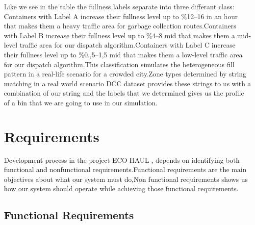 \documentclass[12pt,a4paper]{report}
\begin{document}
\indent Like we see in the table the fullness labels separate into three differant class: Containers with Label A increase their fullness level up to \%12--16  in an hour that makes them a heavy traffic area for garbage collection routes.Containers with Label B increase their fullness level up to \%4--8 mid  that makes them a mid-level traffic area for our dispatch algorithm.Containers with Label C increase their fullness level up to \%0.,5--1,5 mid  that makes them a low-level traffic area for our dispatch algorithm.This classification simulates the heterogeneous fill pattern in a real-life scenario for a crowded city.Zone types determined by string matching in a real world scenario DCC dataset provides these strings to us with a combination of our string and the labels that we determined gives us the profile of  a bin that we are going to use in our simulation.

\section{Requirements}

\indent Development process in the project ECO HAUL , depends on identifying both functional and nonfunctional  requirements.Functional requirements are the main objectives about what our system must do,Non functional requirements shows us how our system should operate while achieving those functional requirements.
\subsection{Functional Requirements}
\end{document}
